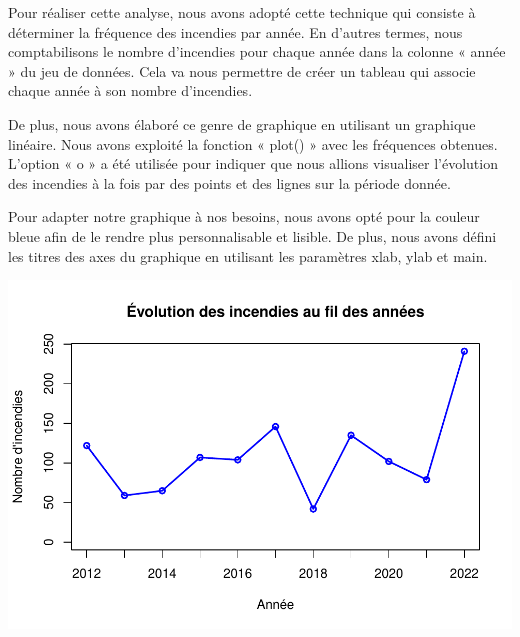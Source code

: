 \documentclass[
]{article}
\newenvironment{Shaded}{\begin{snugshade}}{\end{snugshade}}
\newcommand{\AttributeTok}[1]{\textcolor[rgb]{0.13,0.29,0.53}{#1}}
\newcommand{\CommentTok}[1]{\textcolor[rgb]{0.56,0.35,0.01}{\textit{#1}}}
\newcommand{\FunctionTok}[1]{\textcolor[rgb]{0.13,0.29,0.53}{\textbf{#1}}}
\newcommand{\NormalTok}[1]{#1}
\newcommand{\OtherTok}[1]{\textcolor[rgb]{0.56,0.35,0.01}{#1}}
\newcommand{\SpecialCharTok}[1]{\textcolor[rgb]{0.81,0.36,0.00}{\textbf{#1}}}
\newcommand{\StringTok}[1]{\textcolor[rgb]{0.31,0.60,0.02}{#1}}
\begin{document}
Pour réaliser cette analyse, nous avons adopté cette technique qui
consiste à déterminer la fréquence des incendies par année. En d'autres
termes, nous comptabilisons le nombre d'incendies pour chaque année dans
la colonne « année » du jeu de données. Cela va nous permettre de créer
un tableau qui associe chaque année à son nombre d'incendies.

De plus, nous avons élaboré ce genre de graphique en utilisant un
graphique linéaire. Nous avons exploité la fonction « plot() » avec les
fréquences obtenues. L'option « o » a été utilisée pour indiquer que
nous allions visualiser l'évolution des incendies à la fois par des
points et des lignes sur la période donnée.

Pour adapter notre graphique à nos besoins, nous avons opté pour la
couleur bleue afin de le rendre plus personnalisable et lisible. De
plus, nous avons défini les titres des axes du graphique en utilisant
les paramètres xlab, ylab et main.

\begin{Shaded}
\end{Shaded}

\includegraphics{Rapport_files/figure-latex/setup-1.pdf}
\end{document}
